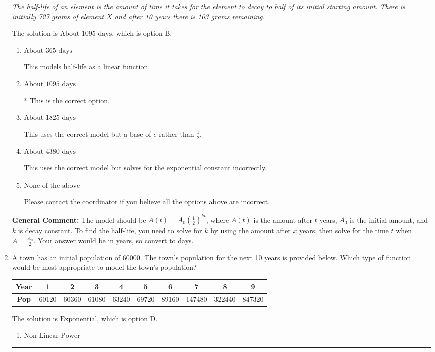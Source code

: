 \documentclass{extbook}[14pt]
\newcommand{\litem}[1]{\item #1

\rule{\textwidth}{0.4pt}}
\begin{document}
\begin{enumerate}
{\begin{center}
    \textit{ The half-life of an element is the amount of time it takes for the element to decay to half of its initial starting amount. There is initially 727 grams of element $X$ and after 10 years there is 103 grams remaining. }
\end{center}
The solution is \( \text{About } 1095 \text{ days} \), which is option B.\begin{enumerate}[label=\Alph*.]
\item \( \text{About } 365 \text{ days} \)

This models half-life as a linear function.
\item \( \text{About } 1095 \text{ days} \)

* This is the correct option.
\item \( \text{About } 1825 \text{ days} \)

This uses the correct model but a base of $e$ rather than $\frac{1}{2}$.
\item \( \text{About } 4380 \text{ days} \)

This uses the correct model but solves for the exponential constant incorrectly.
\item \( \text{None of the above} \)

Please contact the coordinator if you believe all the options above are incorrect.
\end{enumerate}

\textbf{General Comment:} The model should be $A(t) = A_0 (\frac{1}{2})^{kt}$, where $A(t)$ is the amount after $t$ years, $A_0$ is the initial amount, and $k$ is decay constant. To find the half-life, you need to solve for $k$ by using the amount after $x$ years, then solve for the time $t$ when $A = \frac{A_0}{2}$. Your answer would be in years, so convert to days.
}
\litem{
A town has an initial population of 60000. The town's population for the next 10 years is provided below. Which type of function would be most appropriate to model the town's population?


\begin{tabular}{c|c|c|c|c|c|c|c|c|c}
\textbf{Year} &1 &2 &3 &4 &5 &6 &7 &8 &9\tabularnewline \hline
\textbf{Pop} &60120 &60360 &61080 &63240 &69720 &89160 &147480 &322440 &847320\end{tabular}The solution is \( \text{Exponential} \), which is option D.\begin{enumerate}[label=\Alph*.]
\item \( \text{Non-Linear Power} \)


\end{enumerate}}
\end{enumerate}
\end{document}

